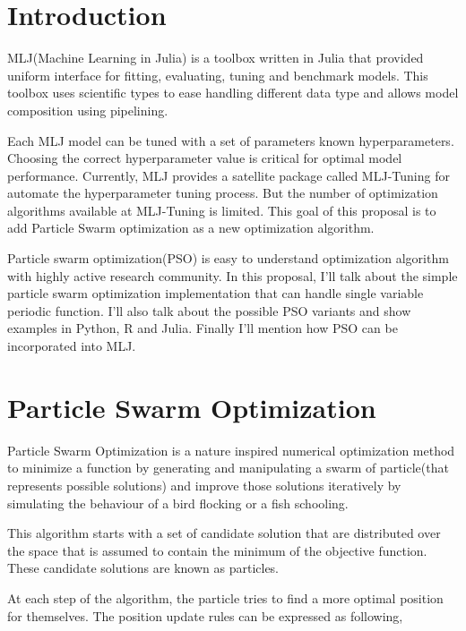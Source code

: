 \documentclass{article}
\begin{document}

\pagebreak

\tableofcontents
\pagebreak

\section{Introduction}

MLJ(Machine Learning in Julia) is a toolbox written in Julia that provided uniform interface for fitting, evaluating, tuning and benchmark models. This toolbox uses scientific types to ease handling different data type and allows model composition using pipelining.

Each MLJ model can be tuned with a set of parameters known hyperparameters. Choosing the correct hyperparameter value is critical for optimal model performance. Currently, MLJ provides a satellite package called MLJ-Tuning for automate the hyperparameter tuning process. But the number of optimization algorithms available at MLJ-Tuning is limited. This goal of this proposal is to add Particle Swarm optimization as a new optimization algorithm.

Particle swarm optimization(PSO) is easy to understand optimization algorithm with highly active research community. In this proposal, I'll talk about the simple particle swarm optimization implementation that can handle single variable periodic function. I'll also talk about the possible PSO variants and show examples in Python, R and Julia. Finally I'll mention how PSO can be incorporated into MLJ.

\section{Particle Swarm Optimization}

Particle Swarm Optimization is a nature inspired numerical optimization method to minimize a function by generating and manipulating a swarm of particle(that represents possible solutions) and improve those solutions iteratively by simulating the behaviour of a bird flocking or a fish schooling.

This algorithm starts with a set of candidate solution that are distributed over the space that is assumed to contain the minimum of the objective function. These candidate solutions are known as particles.

At each step of the algorithm, the particle tries to find a more optimal position for themselves. The position update rules can be expressed as following,
\end{document}
